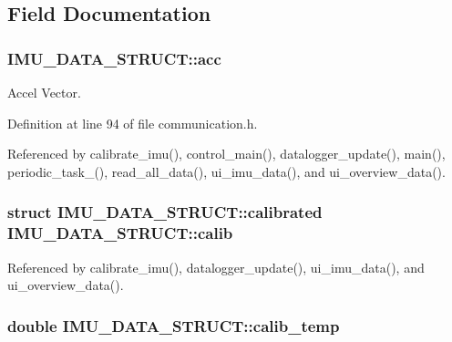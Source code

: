 \subsection{Field Documentation}
\hypertarget{structIMU__DATA__STRUCT_a448f284bf44eb503affda586ad5fa9d2}{
\subsubsection[{acc}]{ I\-M\-U\-\_\-\-D\-A\-T\-A\-\_\-\-S\-T\-R\-U\-C\-T\-::acc}}\label{structIMU__DATA__STRUCT_a448f284bf44eb503affda586ad5fa9d2}


Accel Vector. 



Definition at line 94 of file communication.\-h.



Referenced by calibrate\-\_\-imu(), control\-\_\-main(), datalogger\-\_\-update(), main(), periodic\-\_\-task\-\_(), read\-\_\-all\-\_\-data(), ui\-\_\-imu\-\_\-data(), and ui\-\_\-overview\-\_\-data().

\hypertarget{structIMU__DATA__STRUCT_aeffe3c3c5a7191a5cef16e7aab6c3795}{
\subsubsection[{calib}]{\setlength{\rightskip}{0pt plus 5cm}struct {\bf I\-M\-U\-\_\-\-D\-A\-T\-A\-\_\-\-S\-T\-R\-U\-C\-T\-::calibrated} I\-M\-U\-\_\-\-D\-A\-T\-A\-\_\-\-S\-T\-R\-U\-C\-T\-::calib}}\label{structIMU__DATA__STRUCT_aeffe3c3c5a7191a5cef16e7aab6c3795}


Referenced by calibrate\-\_\-imu(), datalogger\-\_\-update(), ui\-\_\-imu\-\_\-data(), and ui\-\_\-overview\-\_\-data().

\hypertarget{structIMU__DATA__STRUCT_a3553fcee6beba17fe0c7711ac0483875}{
\subsubsection[{calib\-\_\-temp}]{\setlength{\rightskip}{0pt plus 5cm}double I\-M\-U\-\_\-\-D\-A\-T\-A\-\_\-\-S\-T\-R\-U\-C\-T\-::calib\-\_\-temp}}\label{structIMU__DATA__STRUCT_a3553fcee6beba17fe0c7711ac0483875}


